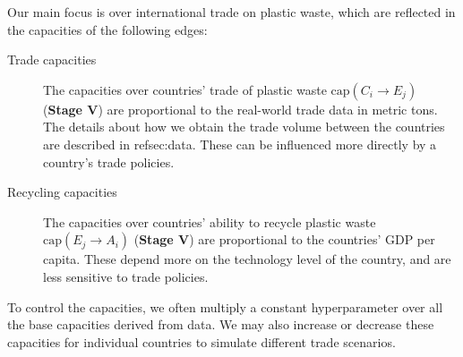 Our main focus is over international trade on plastic waste, which are reflected in the capacities of the following edges:
\begin{description}
\item[Trade capacities] The capacities over countries' trade of plastic waste $\mathrm{cap}(C_i \to E_j)$ (\textbf{Stage V}) are proportional to the real-world trade data in metric tons. The details about how we obtain the trade volume between the countries are described in ref{sec:data}. These can be influenced more directly by a country's trade policies.
\item[Recycling capacities] The capacities over countries' ability to recycle plastic waste $\mathrm{cap}(E_j \to A_i)$ (\textbf{Stage V}) are proportional to the countries' GDP per capita. These depend more on the technology level of the country, and are less sensitive to trade policies.
\end{description}
To control the capacities, we often multiply a constant hyperparameter over all the base capacities derived from data.
We may also increase or decrease these capacities for individual countries to simulate different trade scenarios. 